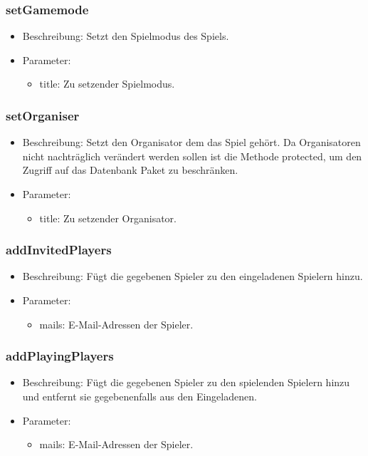 \documentclass[a4paper]{scrreprt}
\begin{document}
    \subsubsection{setGamemode}
    \begin{itemize}
        \item Beschreibung: Setzt den Spielmodus des Spiels.
        \item Parameter:
        \begin{itemize}
            \item title: Zu setzender Spielmodus.
        \end{itemize}
    \end{itemize}

    \subsubsection{setOrganiser}
    \begin{itemize}
        \item Beschreibung: Setzt den Organisator dem das Spiel gehört.
        Da Organisatoren nicht nachträglich verändert werden sollen ist die Methode protected, um den Zugriff auf das Datenbank Paket zu beschränken.
        \item Parameter:
        \begin{itemize}
            \item title: Zu setzender Organisator.
        \end{itemize}
    \end{itemize}

    \subsubsection{addInvitedPlayers}
    \begin{itemize}
        \item Beschreibung: Fügt die gegebenen Spieler zu den eingeladenen Spielern hinzu.
        \item Parameter:
        \begin{itemize}
            \item mails: E-Mail-Adressen der Spieler.
        \end{itemize}
    \end{itemize}

    \subsubsection{addPlayingPlayers}
    \begin{itemize}
        \item Beschreibung: Fügt die gegebenen Spieler zu den spielenden Spielern hinzu und entfernt sie gegebenenfalls aus den Eingeladenen.
        \item Parameter:
        \begin{itemize}
            \item mails: E-Mail-Adressen der Spieler.
        \end{itemize}
    \end{itemize}
\end{document}
